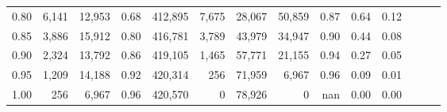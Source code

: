 \begin{tabular}{rrrrrrrrrrrrrr}
0.80 &   6,141 &  12,953 &  0.68 &  412,895 &    7,675 &  28,067 &  50,859 &  0.87 &  0.64 &      0.12 \\
0.85 &   3,886 &  15,912 &  0.80 &  416,781 &    3,789 &  43,979 &  34,947 &  0.90 &  0.44 &      0.08 \\
0.90 &   2,324 &  13,792 &  0.86 &  419,105 &    1,465 &  57,771 &  21,155 &  0.94 &  0.27 &      0.05 \\
0.95 &   1,209 &  14,188 &  0.92 &  420,314 &      256 &  71,959 &   6,967 &  0.96 &  0.09 &      0.01 \\
1.00 &     256 &   6,967 &  0.96 &  420,570 &        0 &  78,926 &       0 &   nan &  0.00 &      0.00 \\
\bottomrule
\end{tabular}
